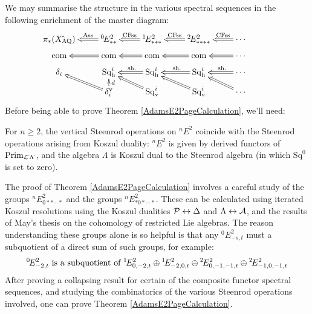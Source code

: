 \documentclass[11pt]{article}
\theoremstyle{plain}
\newcommand{\Sq}{\mathrm{Sq}}
\begin{document}
\noindent We may summarise the structure in the various spectral sequences in the following enrichment of the master diagram:
\[\xymatrix@R=2mm{
\pi_{*}(X{\hat{\,}_\textup{\!\!AQ}})&%
\ar@{=>}[l]_-{\textup{Ass}}
{^{0\!}}E^2_{**}&%
\ar@{=>}[l]_-{\textup{CFss}}
{^{1\!}}E^2_{***}
&%
{^{2\!}}E^2_{****}
\ar@{=>}[l]_-{\textup{CFss}}&%
\cdots
\ar@{=>}[l]_-{\textup{CFss}}%
\\
\textup{com}&
\textup{com}\ar@{=>}[l]&
\textup{com}\ar@{=>}[l]&
\textup{com}\ar@{=>}[l]&
\cdots \ar@{=>}[l]\\
\delta_i&
\Sq^i_\textup{h}&
\Sq^i_\textup{h}\ar@{=>}[l]_-{\ \textup{sh.}}&
\Sq^i_\textup{h}\ar@{=>}[l]_-{\ \textup{sh.}}&
\cdots \ar@{=>}[l]_-{\ \textup{sh.}}\\
&
\delta^\textup{v}_i\ar@{=>}[ul]\ar[u]_-d
&
\Sq_\textup{v}^i\ar@{=>}[ul]&
\Sq_\textup{v}^i\ar@{=>}[ul]&
\cdots \ar@{=>}[ul]&
}\]
Before being able to prove Theorem \ref{AdamsE2PageCalculation}, we'll need:
\begin{thm*}
For $n\geq2$, the vertical Steenrod operations on ${^{n\!}}E^2$ coincide with the Steenrod operations arising from Koszul duality: %
${^{n\!}}E^2$ is given by derived functors of $\textup{Prim}_{\mathcal{L}{\hat{\,}}\Lambda{\hat{\,}}}$, and the algebra $\Lambda$ is Koszul dual to the Steenrod algebra (in which $\Sq^0$ is set to zero).
\end{thm*}
\noindent The proof of Theorem \ref{AdamsE2PageCalculation} involves a careful study of the groups ${^{n\!}}E^2_{0**\cdots *}$ and the groups ${^{n\!}}E^2_{*0*\cdots *}$. These can be calculated using iterated Koszul resolutions using the Koszul dualities $\mathcal{P}\leftrightarrow\Delta$ and $\Lambda\leftrightarrow\mathcal{A}$, and the results of May's thesis \cite{MayRestLie.pdf} on the cohomology of restricted Lie algebras. The reason understanding these groups alone is so helpful is that any ${^{0\!}}E^2_{-s,t}$ must a subquotient of a direct sum of such groups, for example:
\[{^{0\!}}E^2_{-2,t}\textup{ is a subquotient of }{^{1\!}}E^2_{0,-2,t}\oplus {^{1\!}}E^2_{-2,0,t}\oplus {^{2\!}}E^2_{0,-1,-1,t}\oplus {^{2\!}}E^2_{-1,0,-1,t}\]
After proving a collapsing result for certain of the composite functor spectral sequences, and studying the combinatorics of the various Steenrod operations involved, one can prove Theorem \ref{AdamsE2PageCalculation}.
\end{document}

